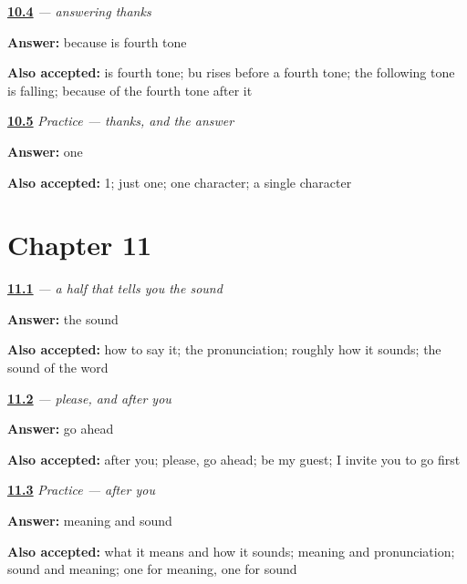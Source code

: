 \noindent\begin{minipage}[t]{\linewidth}
\raggedright
\hyperlink{review-ZH-C10-buxie-tone}{\textbf{10.4}} \emph{ — answering thanks}\par
\small \textbf{Answer:} because  is fourth tone\par
\footnotesize \textbf{Also accepted:}  is fourth tone; bu rises before a fourth tone; the following tone is falling; because of the fourth tone after it
\end{minipage}\par\medskip

\noindent\begin{minipage}[t]{\linewidth}
\raggedright
\hyperlink{review-ZH-C10-practice-cost}{\textbf{10.5}} \emph{Practice — thanks, and the answer}\par
\small \textbf{Answer:} one\par
\footnotesize \textbf{Also accepted:} 1; just one; one character; a single character
\end{minipage}\par\medskip

\section*{Chapter 11}

\noindent\begin{minipage}[t]{\linewidth}
\raggedright
\hyperlink{review-ZH-W11-qing-halves}{\textbf{11.1}} \emph{ — a half that tells you the sound}\par
\small \textbf{Answer:} the sound\par
\footnotesize \textbf{Also accepted:} how to say it; the pronunciation; roughly how it sounds; the sound of the word
\end{minipage}\par\medskip

\noindent\begin{minipage}[t]{\linewidth}
\raggedright
\hyperlink{review-ZH-C11-qing-alone}{\textbf{11.2}} \emph{ — please, and after you}\par
\small \textbf{Answer:} go ahead\par
\footnotesize \textbf{Also accepted:} after you; please, go ahead; be my guest; I invite you to go first
\end{minipage}\par\medskip

\noindent\begin{minipage}[t]{\linewidth}
\raggedright
\hyperlink{review-ZH-C11-practice-halves}{\textbf{11.3}} \emph{Practice — after you}\par
\small \textbf{Answer:} meaning and sound\par
\footnotesize \textbf{Also accepted:} what it means and how it sounds; meaning and pronunciation; sound and meaning; one for meaning, one for sound
\end{minipage}\par\medskip

